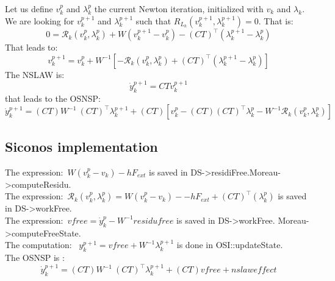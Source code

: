 Let us define $v_k^p$ and $\lambda_k^p$ the current Newton iteration, initialized with $v_k$ and $\lambda_k$.
We are looking for $v_k^{p+1}$ and $\lambda_k^{p+1}$ such that $R_{L_k} (v_k^{p+1},\lambda_k^{p+1}) =0$. That is:
\begin{equation}
  \label{eq:newton_NE1_eq1}
  0 =\mathcal R_k (v_k^p,\lambda_k^p)+W(v_k^{p+1}-v_k^p)-(CT)^\top(\lambda_k^{p+1} - \lambda_k^p)
\end{equation}
That leads to:
\begin{equation}
  \label{eq:newton_NE1_eq2}
  v_k^{p+1} =v_k^p+W^{-1}[-\mathcal R_k (v_k^p,\lambda_k^p)+(CT)^\top(\lambda_k^{p+1} - \lambda_k^p)]
\end{equation}
The NSLAW is:
\begin{equation}
  \label{eq:newton_NE1_nslaw1}
  \dot y_k^{p+1}=CTv_k^{p+1}
\end{equation}
that leads to the OSNSP:
\begin{equation}
  \label{eq:newton_NE1_osnsp}
  \dot y_k^{p+1}=(CT)W^{-1}~(CT)^\top\lambda_k^{p+1}+(CT)[v_k^p-(CT)(CT)^\top\lambda_k^p-W^{-1}\mathcal R_k (v_k^p,\lambda_k^p)]
\end{equation}
\subsection{Siconos implementation}

The expression:~$W(v_k^p-v_k)-hF_{ext}$ is saved in DS->residiFree.Moreau->computeResidu.\\
The expression:~$\mathcal R_k(v_k^p,\lambda_k^p)=W(v_k^p-v_k)--hF_{ext}+(CT)^\top(\lambda_k^p)$ is saved in DS->workFree.\\
The expression:~$vfree=\dot y_k^{p} - W^{-1} residufree$ is saved in DS->workFree. Moreau->computeFreeState.\\
The computation:~ $y_k^{p+1}=vfree+W^{-1}\lambda_k^{p+1}$ is done in OSI::updateState.\\
The OSNSP is :
\begin{equation}
  \dot y_k^{p+1}=(CT)W^{-1}~(CT)^\top\lambda_k^{p+1}+(CT)vfree+nslaweffect
\end{equation}

